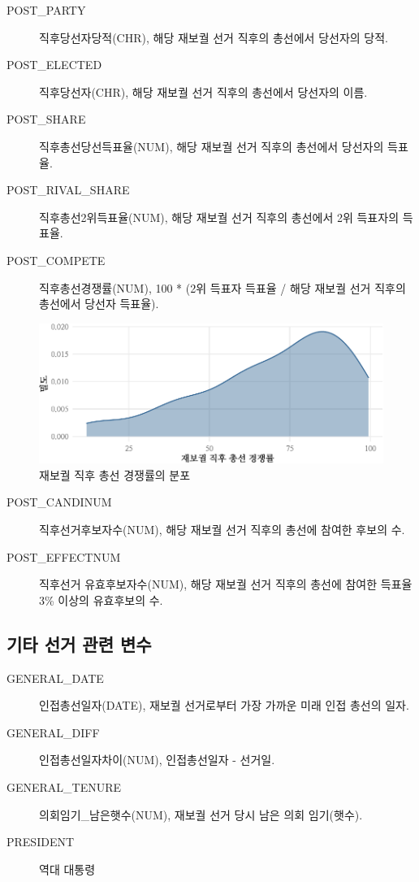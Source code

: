 \documentclass[
  11pt,
  letter]{article}
\begin{document}
\begin{description}
\item[POST\_PARTY]
직후당선자당적(CHR), 해당 재보궐 선거 직후의 총선에서 당선자의 당적.
\item[POST\_ELECTED]
직후당선자(CHR), 해당 재보궐 선거 직후의 총선에서 당선자의 이름.
\item[POST\_SHARE]
직후총선당선득표율(NUM), 해당 재보궐 선거 직후의 총선에서 당선자의
득표율.
\item[POST\_RIVAL\_SHARE]
직후총선2위득표율(NUM), 해당 재보궐 선거 직후의 총선에서 2위 득표자의
득표율.
\item[POST\_COMPETE]
직후총선경쟁률(NUM), 100 * (2위 득표자 득표율 / 해당 재보궐 선거 직후의
총선에서 당선자 득표율).
\end{description}

\begin{figure}
\centering
\includegraphics{Codebook_national_files/figure-latex/unnamed-chunk-17-1.pdf}
\caption{재보궐 직후 총선 경쟁률의 분포}
\end{figure}

\begin{description}
\item[POST\_CANDINUM]
직후선거후보자수(NUM), 해당 재보궐 선거 직후의 총선에 참여한 후보의 수.
\item[POST\_EFFECTNUM]
직후선거 유효후보자수(NUM), 해당 재보궐 선거 직후의 총선에 참여한 득표율
3\% 이상의 유효후보의 수.
\end{description}

\hypertarget{uxae30uxd0c0-uxc120uxac70-uxad00uxb828-uxbcc0uxc218}{%
\subsection{기타 선거 관련
변수}\label{uxae30uxd0c0-uxc120uxac70-uxad00uxb828-uxbcc0uxc218}}

\begin{description}
\item[GENERAL\_DATE]
인접총선일자(DATE), 재보궐 선거로부터 가장 가까운 미래 인접 총선의 일자.
\item[GENERAL\_DIFF]
인접총선일자차이(NUM), 인접총선일자 - 선거일.
\item[GENERAL\_TENURE]
의회임기\_남은햇수(NUM), 재보궐 선거 당시 남은 의회 임기(햇수).
\item[PRESIDENT]
역대 대통령
\end{description}
\end{document}
